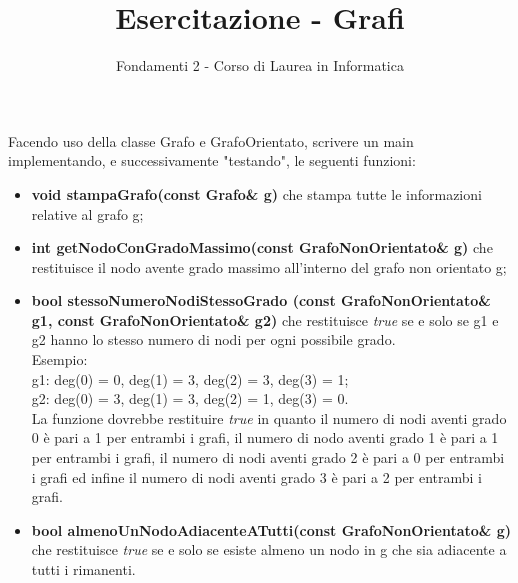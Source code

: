 \documentclass{article}
\title{Esercitazione - Grafi}
\author{Fondamenti 2 - Corso di Laurea in Informatica }
\date{}
\begin{document}
\maketitle

\noindent Facendo uso della classe Grafo e GrafoOrientato, scrivere un main implementando, e successivamente "testando", le seguenti funzioni:
\begin{itemize}
    \item \textbf{void stampaGrafo(const Grafo\& g)} che stampa tutte le informazioni relative al grafo g;
    \item \textbf{int getNodoConGradoMassimo(const GrafoNonOrientato\& g)} che restituisce il nodo avente grado massimo all'interno del grafo non orientato g;\\
    \item \textbf{bool stessoNumeroNodiStessoGrado (const GrafoNonOrientato\& g1, const GrafoNonOrientato\& g2)} che restituisce \textit{true} se e solo se g1 e g2 hanno lo stesso numero di nodi per ogni possibile grado. \\
    
    Esempio:\\
    g1: deg(0) = 0, deg(1) = 3, deg(2) = 3, deg(3) = 1;\\
    g2: deg(0) = 3, deg(1) = 3, deg(2) = 1, deg(3) = 0.\\
    
    La funzione dovrebbe restituire \textit{true} in quanto il numero di nodi aventi grado 0 è pari a 1 per entrambi i grafi, il numero di nodo aventi grado 1 è pari a 1 per entrambi i grafi, il numero di nodi aventi grado 2 è pari a 0 per entrambi i grafi ed infine il numero di nodi aventi grado 3 è pari a 2 per entrambi i grafi.

    \item \textbf{bool almenoUnNodoAdiacenteATutti(const GrafoNonOrientato\& g)} che restituisce \textit{true} se e solo se esiste almeno un nodo in g che sia adiacente a tutti i rimanenti.


\end{itemize}
\end{document}
